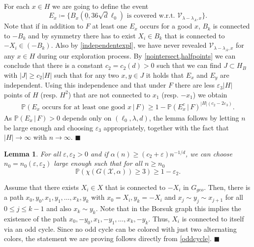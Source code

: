 \documentclass[11pt]{article}%
\newenvironment{proof}{\vspace{1ex}\noindent{\bf Proof.}}{\hspace*{\fill}$\blacksquare$\vspace{1ex}}
\newtheorem{lemma}[lemma]{Lemma}
\newcommand{\eps}{\varepsilon}
\newcommand{\Pro}{\mathbb{P}}
\newcommand{\typ}{\underline{0}}
\begin{document}
\begin{proof}
\begin{equation*}
\begin{split}
		\end{split}
	\end{equation*}
	For each $ x\in H $ we are going to define the event 
	\begin{equation*}
		E_x\coloneqq\{B_x(\typ,36\sqrt{d}\ell_0)\text{ is covered w.r.t. }\mathcal{V}_{\lambda-\lambda_{A},x}\}.
	\end{equation*}
 Note that if in addition to $ F $ at least one $ E_{x} $ occurs for a good $ x $, $ B_k $ is connected to $ -B_k $ and by symmetry there has to exist $ X_i\in B_k $ that is connected to $ -X_i\in (-B_k) $. Also by \cref{independentexpl}, we have never revealed $ \mathcal{V}_{\lambda-\lambda_{A},x} $ for any $ x\in H $ during our exploration process. By \cref{nointersect,halfpoints} we can conclude that there is a constant $ c_2=c_2(d) >0$ such that we can find $ J\subset H_B $ with $ |J|\geq c_2|H| $ such that for any two $ x,y\in J $ it holds that $ E_x $ and $ E_y $ are independent. Using this independence and that under $ F$ there are less $ \eps_3 |H|$ points of $ H $ (resp. $ H^2 $) that are not connected to $ x_1 $ (resp. $ -x_1 $) we obtain 
	\begin{equation*}
		\begin{split}
			\Pro(E_x\text{ occurs for at least one good }x\,\vert\,F)\geq1-\Pro(E_x^c\,\vert\, F)^{|H|(c_2-2\eps_3)}.
		\end{split}
	\end{equation*}
As $ \Pro(E_x\,\vert\, F)>0 $ depends only on $ (\ell_0,\lambda,d) $,
	the lemma follows by letting $ n $ be large enough and choosing $ \eps_3 $ appropriately, together with the fact that $ |H|\to\infty $ with $ n\to\infty $.
\end{proof}


\begin{lemma}\label{finallemmachrom3}
		For all $ \eps,\eps_2>0 $ and if $  \alpha(n)\geq (c_2+\eps)n^{-1/d} $, we can choose $ n_0=n_0(\eps,\eps_2) $ large enough such that for all $ n\geq n_0 $
		\begin{equation*}
		\Pro(\chi(G(\mathcal{X},\alpha))\geq 3)\geq 1-\eps_2.
		\end{equation*}
\end{lemma}


\begin{proof}
	Assume that there exists $  X_i\in X $ that is connected to $ -X_i $ in   $ G_{geo} $. Then, there is a path $ x_0,y_0,x_1,y_1,\dots,x_{k},y_{k} $ with $ x_0=X_i, y_k=-X_{i}  $ and $ x_j\sim y_{j}\sim x_{j+1} $ for all $ 0\leq j\leq k-1 $ and also $ x_k\sim y_k $. Note that in the Borsuk graph this implies the existence of the path $ x_0,-y_0,x_1,-y_1,\dots,x_{k},-y_{k} $. Thus, $ X_i $ is connected to itself via an odd cycle. Since no odd cycle can be colored with just two alternating colors, the statement we are proving follows directly from \cref{oddcycle}.
\end{proof}
\end{document}
